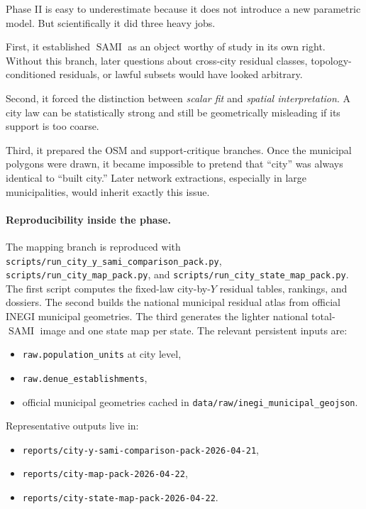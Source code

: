 \documentclass[11pt]{article}
\newcommand{\SAMI}{\operatorname{SAMI}}
\begin{document}
Phase II is easy to underestimate because it does not introduce a new parametric model. But scientifically it did three heavy jobs.

First, it established \(\SAMI\) as an object worthy of study in its own right. Without this branch, later questions about cross-city residual classes, topology-conditioned residuals, or lawful subsets would have looked arbitrary.

Second, it forced the distinction between \emph{scalar fit} and \emph{spatial interpretation}. A city law can be statistically strong and still be geometrically misleading if its support is too coarse.

Third, it prepared the OSM and support-critique branches. Once the municipal polygons were drawn, it became impossible to pretend that ``city'' was always identical to ``built city.'' Later network extractions, especially in large municipalities, would inherit exactly this issue.

\paragraph{Reproducibility inside the phase.}
The mapping branch is reproduced with
\texttt{scripts/run\_city\_y\_sami\_comparison\_pack.py},
\texttt{scripts/run\_city\_map\_pack.py},
and
\texttt{scripts/run\_city\_state\_map\_pack.py}.
The first script computes the fixed-law city-by-\(Y\) residual tables, rankings, and dossiers. The second builds the national municipal residual atlas from official INEGI municipal geometries. The third generates the lighter national total-\(\SAMI\) image and one state map per state. The relevant persistent inputs are:
\begin{itemize}
\item \texttt{raw.population\_units} at city level,
\item \texttt{raw.denue\_establishments},
\item official municipal geometries cached in \texttt{data/raw/inegi\_municipal\_geojson}.
\end{itemize}
Representative outputs live in:
\begin{itemize}
\item \texttt{reports/city-y-sami-comparison-pack-2026-04-21},
\item \texttt{reports/city-map-pack-2026-04-22},
\item \texttt{reports/city-state-map-pack-2026-04-22}.
\end{itemize}
\end{document}
